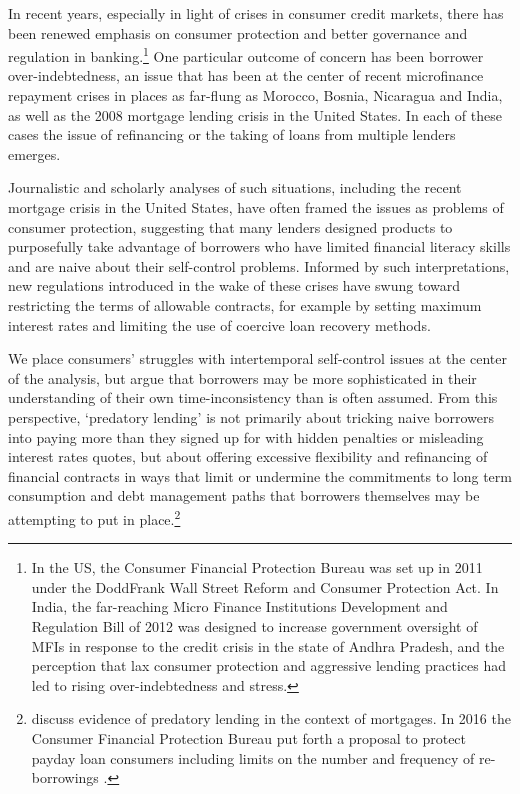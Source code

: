 \documentclass[11pt,english]{article}
\theoremstyle{plain}
\theoremstyle{definition}
\begin{document}
In recent years, especially in light of crises in consumer credit
markets, there has been renewed emphasis on consumer protection and
better governance and regulation in banking.\footnote{In the US, the Consumer Financial Protection Bureau was set up in
2011 under the Dodd\textendash Frank Wall Street Reform and Consumer
Protection Act. In India, the far-reaching Micro Finance Institutions
Development and Regulation Bill of 2012 was designed to increase government
oversight of MFIs in response to the credit crisis in the state of
Andhra Pradesh, and the perception that lax consumer protection and
aggressive lending practices had led to rising over-indebtedness and
stress.} One particular outcome of concern has been borrower over-indebtedness,
an issue that has been at the center of recent microfinance repayment
crises in places as far-flung as Morocco, Bosnia, Nicaragua and India,
as well as the 2008 mortgage lending crisis in the United States.
In each of these cases the issue of refinancing or the taking of loans
from multiple lenders emerges.

Journalistic and scholarly analyses of such situations, including
the recent mortgage crisis in the United States, have often framed
the issues as problems of consumer protection, suggesting that many
lenders designed products to purposefully take advantage of borrowers
who have limited financial literacy skills and are naive about their
self-control problems. Informed by such interpretations, new regulations
introduced in the wake of these crises have swung toward restricting
the terms of allowable contracts, for example by setting maximum interest
rates and limiting the use of coercive loan recovery methods.

We place consumers' struggles with intertemporal self-control issues
at the center of the analysis, but argue that borrowers may be more
sophisticated in their understanding of their own time-inconsistency
than is often assumed. From this perspective, `predatory lending'
is not primarily about tricking naive borrowers into paying more than
they signed up for with hidden penalties or misleading interest rates
quotes, but about offering excessive flexibility and refinancing of
financial contracts in ways that limit or undermine the commitments
to long term consumption and debt management paths that borrowers
themselves may be attempting to put in place.\footnote{\citet{bond2009a} discuss evidence of predatory lending in the context
of mortgages. In 2016 the Consumer Financial Protection Bureau put
forth a proposal to protect payday loan consumers including limits
on the number and frequency of re-borrowings \citep{cfpb2016}.}
\end{document}
